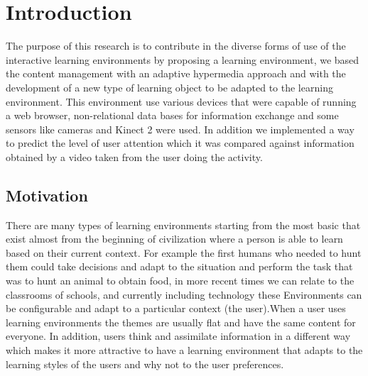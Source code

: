 \chapter{Introduction} \label{introduction} 

The purpose of this research is to contribute in the diverse forms of use of the interactive learning environments by proposing a learning environment, we based the content management with an adaptive hypermedia approach and 
with the development of a new type of learning object to be adapted to the learning environment.
This environment use various devices that were capable of running a web browser, non-relational data bases for information exchange and some sensors like cameras and Kinect 2 were used. In addition we implemented a way to predict the level of user attention
which it was compared against information obtained by a video taken from the user doing the activity.

\section{Motivation}
There are many types of learning environments starting from the most basic that exist almost from the beginning of civilization where a person is able to learn based on their current context.
For example the first humans who needed to hunt them could take decisions and adapt to the situation and perform the task that was to hunt an animal to obtain food, in more recent times we can relate to the classrooms of schools, and currently including technology these Environments can be configurable and adapt to a particular context (the user).When a user uses learning environments the themes are usually flat and have the same content for everyone. In addition, users think and assimilate information in a different way which makes it more attractive to have a learning environment that adapts to the learning styles of the users and why not to the user preferences.

